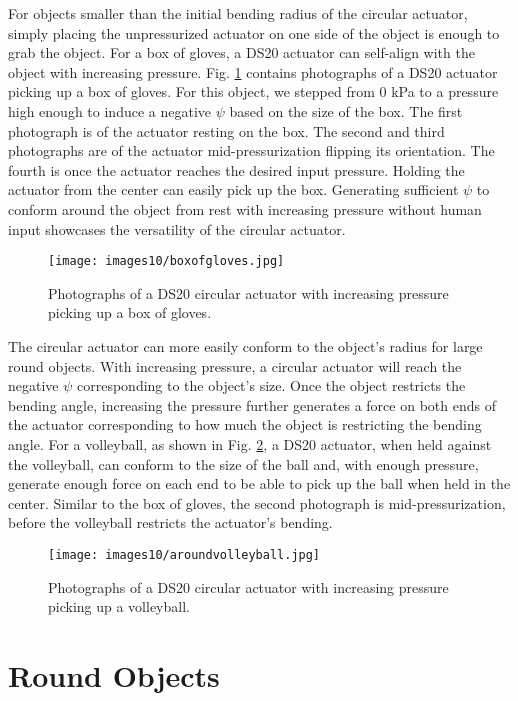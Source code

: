 For objects smaller than the initial bending radius of the circular actuator, simply placing the unpressurized actuator on one side of the object is enough to grab the object. For a box of gloves, a DS20 actuator can self-align with the object with increasing pressure. Fig. \ref{fig:boxofgloves} contains photographs of a DS20 actuator picking up a box of gloves. For this object, we stepped from 0 kPa to a pressure high enough to induce a negative $\psi$ based on the size of the box. The first photograph is of the actuator resting on the box. The second and third photographs are of the actuator mid-pressurization flipping its orientation. The fourth is once the actuator reaches the desired input pressure. Holding the actuator from the center can easily pick up the box. Generating sufficient $\psi$ to conform around the object from rest with increasing pressure without human input showcases the versatility of the circular actuator. 

\begin{figure}[!ht]
    \centering
     \texttt{[image: images10/boxofgloves.jpg]}
    \caption{Photographs of a DS20 circular actuator with increasing pressure picking up a box of gloves.}
    \label{fig:boxofgloves}
\end{figure}

The circular actuator can more easily conform to the object's radius for large round objects. With increasing pressure, a circular actuator will reach the negative $\psi$ corresponding to the object's size. Once the object restricts the bending angle, increasing the pressure further generates a force on both ends of the actuator corresponding to how much the object is restricting the bending angle. For a volleyball, as shown in Fig. \ref{fig:aroundvolleyball}, a DS20 actuator, when held against the volleyball, can conform to the size of the ball and, with enough pressure, generate enough force on each end to be able to pick up the ball when held in the center. Similar to the box of gloves, the second photograph is mid-pressurization, before the volleyball restricts the actuator's bending.

\begin{figure}[!ht]
    \centering
     \texttt{[image: images10/aroundvolleyball.jpg]}
    \caption{Photographs of a DS20 circular actuator with increasing pressure picking up a volleyball.}
    \label{fig:aroundvolleyball}
\end{figure}

\section{Round Objects}

